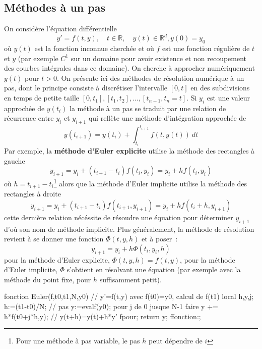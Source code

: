\documentclass[a4paper,11pt]{book}
\begin{document}
\begin{giacjshere}
\subsection{Méthodes à un pas}
On considère l'équation différentielle 
$$y'=f(t,y), \quad t \in \mathbb{R}, \quad y(t) \in \mathbb{R}^d, y(0)=y_0$$ 
o\`u $y(t)$ est la fonction inconnue cherchée
et où $f$ est une fonction régulière de $t$ et $y$ (par exemple
$C^1$ sur un domaine pour avoir existence et non recoupement des courbes
int\'egrales dans ce domaine).  On cherche
à approcher numériquement $y(t)$ pour $t>0$. 
On présente ici des méthodes de résolution numérique à un pas,
dont le principe consiste à discrétiser l'intervalle $[0,t]$ en des
subdivisions en temps de petite taille $[0,t_1], [t_1,t_2], ..., 
[t_{n-1},t_n=t]$. Si $y_i$ est une valeur approchée de $y(t_i)$
la méthode à un pas se traduit par une relation de récurrence entre
$y_i$ et $y_{i+1}$ qui reflète une méthode d'intégration
approchée de
$$ y(t_{i+1})=y(t_i)+\int_{t_i}^{t_{i+1}} f(t,y(t)) \ dt$$
Par exemple, la {\bf méthode d'Euler explicite} 
utilise la méthode des
rectangles à gauche
$$ y_{i+1} = y_i + (t_{i+1}-t_i) f(t_i,y_i)=y_i+hf(t_i,y_i)$$
o\`u $h=t_{i+1}-t_i$\footnote{Pour une m\'ethode \`a pas variable,
le pas $h$ peut d\'ependre de $i$} 
alors que la méthode d'Euler implicite utilise la méthode 
des rectangles à droite
$$ y_{i+1} = y_i + (t_{i+1}-t_i) f(t_{i+1},y_{i+1})=y_i+hf(t_{i}+h,y_{i+1})$$
cette dernière relation nécéssite de résoudre une équation pour
déterminer $y_{i+1}$ d'où son nom de méthode implicite.
Plus g\'en\'eralement, la m\'ethode de r\'esolution revient \`a
se donner une fonction $\Phi(t,y,h)$ et \`a poser~:
$$ y_{i+1}=y_i+h\Phi(t_i,y_i,h)$$
pour la m\'ethode d'Euler explicite, $\Phi(t,y,h)=f(t,y)$, pour
la m\'ethode d'Euler implicite, $\Phi$ s'obtient en r\'esolvant une 
\'equation (par exemple avec la m\'ethode du point fixe, pour $h$
suffisamment petit).
\begin{giacprog}
fonction Euler(f,t0,t1,N,y0)
  // y'=f(t,y) avec f(t0)=y0, calcul de f(t1)
  local h,y,j;
  h:=(t1-t0)/N; // pas
  y:=evalf(y0);
  pour j de 0 jusque N-1 faire
    y += h*f(t0+j*h,y); // y(t+h)=y(t)+h*y'
  fpour;
  return y;
ffonction:;
\end{giacprog}


\end{giacjshere}
\end{document}
